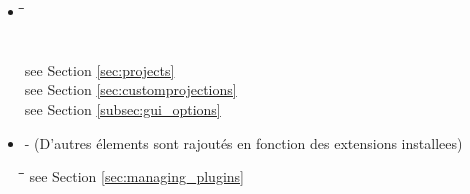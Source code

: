 \begin{itemize}
\item {}
\begin{tabbing}
\hspace{4.5cm}\=\hspace{3cm}\=\hspace{3.5cm}\= \kill
{}  
 \>           
 \>           
 \\
 \>           
 \>           
 \\
 \>
 \>           
 \\
 \> 
 \>           
 see Section \ref{sec:projects}
 \\
\> \>           
see Section \ref{sec:customprojections}
 \\
\> \>           
see Section \ref{subsec:gui_options}
 \\
\end{tabbing}

\item {} - (D'autres \'elements sont rajoutés en fonction des extensions installees)
\begin{tabbing}
\hspace{4.5cm}\=\hspace{3cm}\=\hspace{3.5cm}\= \kill
{}              
\> \>           
see Section \ref{sec:managing_plugins}
 \\
\end{tabbing}    


%
%
%


\end{itemize}
